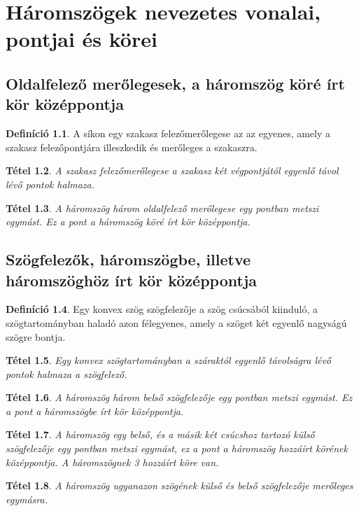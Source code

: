 \documentclass[twoside,12pt]{report}
\newtheorem{theorem}{Tétel}[section]
\theoremstyle{definition}
\newtheorem{definition}[theorem]{Definíció}
\begin{document}
\chapter{Háromszögek nevezetes vonalai, pontjai és körei}
\section{Oldalfelező merőlegesek, a háromszög köré írt kör középpontja}
	\begin{definition}
		A síkon egy szakasz felezőmerőlegese az az egyenes, amely a szakasz felezőpontjára
		illeszkedik és merőleges a szakaszra.
	\end{definition}
	\begin{theorem}
		A szakasz felezőmerőlegese a szakasz két végpontjától egyenlő távol lévő pontok halmaza.
	\end{theorem}
	\begin{theorem}
		A háromszög három oldalfelező merőlegese egy pontban metszi egymást. Ez a pont a háromszög
		köré írt kör középpontja.
	\end{theorem}
\section{Szögfelezők, háromszögbe, illetve háromszöghöz írt kör középpontja}
	\begin{definition}
		Egy konvex szög szögfelezője a szög csúcsából kiinduló, a szögtartományban haladó
		azon félegyenes, amely a szöget két egyenlő nagyságú szögre bontja.
	\end{definition}
	\begin{theorem}
		Egy konvex szögtartományban a száraktól egyenlő távolságra lévő pontok halmaza a szögfelező.
	\end{theorem}
	\begin{theorem}
		A háromszög három belső szögfelezője egy pontban metszi egymást. Ez a pont a háromszögbe
		írt kör középpontja.
	\end{theorem}
	\begin{theorem}
		A háromszög egy belső, és a másik két csúcshoz tartozó külső szögfelezője egy pontban
		metszi egymást, ez a pont a háromszög hozzáírt körének középpontja. A háromszögnek 3
		hozzáírt köre van.
	\end{theorem}
	\begin{theorem}
		A háromszög ugyanazon szögének külső és belső szögfelezője merőleges egymásra.
	\end{theorem}
\end{document}
